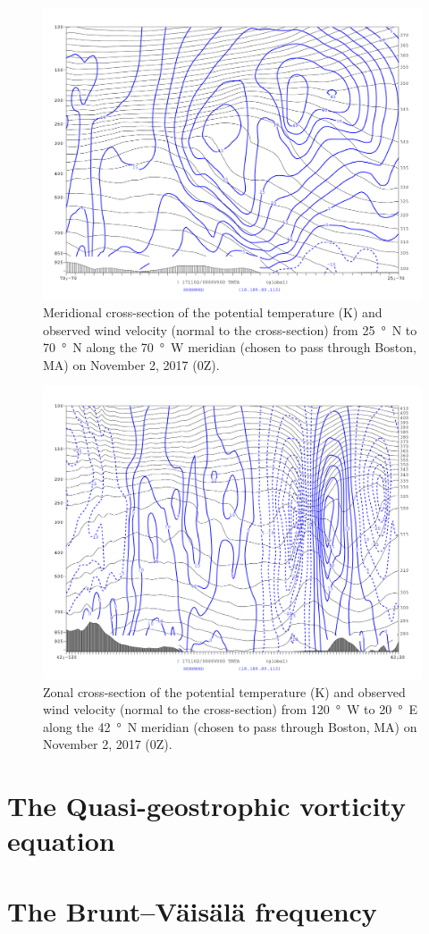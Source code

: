 \documentclass[11pt]{article}
\begin{document}
\begin{figure}[h!]
  \centering
  \includegraphics[width=\textwidth]{thta_normwnd_70W_25-70N}
  \caption{Meridional cross-section of the potential temperature (K) and observed wind velocity (normal to the cross-section) from \SI{25}{\degree N} to \SI{70}{\degree N} along the \SI{70}{\degree W} meridian (chosen to pass through Boston, MA) on November 2, 2017 (0Z).}
  \label{fig:thta_normwnd_mer_xsec}
\end{figure}

\begin{figure}[h!]
  \centering
  \includegraphics[width=\textwidth]{thta_normwnd_42N_120W-20E}
  \caption{Zonal cross-section of the potential temperature (K) and observed wind velocity (normal to the cross-section) from \SI{120}{\degree W} to \SI{20}{\degree E} along the \SI{42}{\degree N} meridian (chosen to pass through Boston, MA) on November 2, 2017 (0Z).}
  \label{fig:thta_normwnd_zon_xsec}
\end{figure}

\section{The Quasi-geostrophic vorticity equation}

\section{The Brunt--Väisälä frequency}
\end{document}
